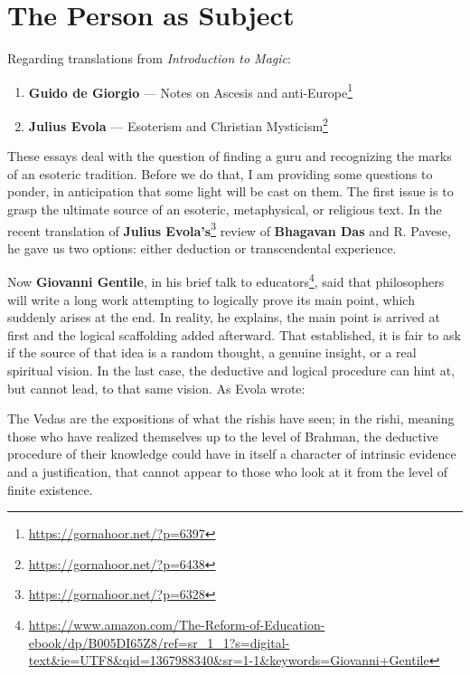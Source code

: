 \section{The Person as Subject}

Regarding translations from \textit{Introduction to Magic}:

\begin{enumerate}


\item \textbf{Guido de Giorgio} --- Notes on Ascesis and anti-Europe\footnote{\url{https://gornahoor.net/?p=6397}}

\item \textbf{Julius Evola} --- Esoterism and Christian Mysticism\footnote{\url{https://gornahoor.net/?p=6438}}
\end{enumerate}


These essays deal with the question of finding a guru and recognizing the marks of an esoteric tradition. Before we do that, I am providing some questions to ponder, in anticipation that some light will be cast on them. The first issue is to grasp the ultimate source of an esoteric, metaphysical, or religious text. In the recent translation of \textbf{Julius Evola's}\footnote{\url{https://gornahoor.net/?p=6328}} review of \textbf{Bhagavan Das} and R. Pavese, he gave us two options: either deduction or transcendental experience.

Now \textbf{Giovanni Gentile}, in his brief talk to educators\footnote{\url{https://www.amazon.com/The-Reform-of-Education-ebook/dp/B005DI65Z8/ref=sr_1_1?s=digital-text\&ie=UTF8\&qid=1367988340\&sr=1-1\&keywords=Giovanni+Gentile}}, said that philosophers will write a long work attempting to logically prove its main point, which suddenly arises at the end. In reality, he explains, the main point is arrived at first and the logical scaffolding added afterward. That established, it is fair to ask if the source of that idea is a random thought, a genuine insight, or a real spiritual vision. In the last case, the deductive and logical procedure can hint at, but cannot lead, to that same vision. As Evola wrote:

\begin{quotex}
The Vedas are the expositions of what the rishis have seen; in the rishi, meaning those who have realized themselves up to the level of Brahman, the deductive procedure of their knowledge could have in itself a character of intrinsic evidence and a justification, that cannot appear to those who look at it from the level of finite existence.
\end{quotex}


